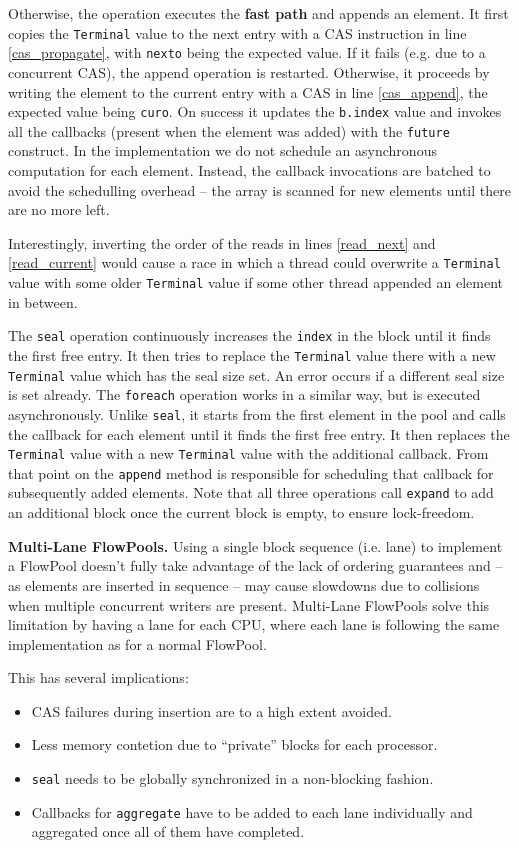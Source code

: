\documentclass[runningheads,a4paper]{llncs}
\begin{document}
Otherwise, the operation executes the \textbf{fast path} and appends
an element.
It first copies the \verb=Terminal= value to the next entry with a CAS
instruction in line \ref{cas_propagate}, with \verb=nexto= being the
expected value. If it fails (e.g. due to a concurrent CAS), the append
operation is restarted.
Otherwise, it proceeds by writing the element to the current entry with
a CAS in line \ref{cas_append}, the expected value being
\verb=curo=.
On success it updates the \verb=b.index= value and invokes all
the callbacks (present when the element was added) with
the \verb=future= construct.
In the implementation we do not schedule an asynchronous
computation for each element.
Instead, the callback invocations are batched to avoid the schedulling overhead
-- the array is scanned for new elements
until there are no more left.

Interestingly, inverting the order of the reads in lines
\ref{read_next} and \ref{read_current} would cause a race in which a
thread could overwrite a \verb=Terminal= value with some older
\verb=Terminal= value if some other thread appended an element in between.

The \verb=seal= operation continuously increases the \verb=index= in the block
until it finds the first free entry. It then tries to replace the \verb=Terminal=
value there with a new \verb=Terminal= value which has the seal size set.
An error occurs if a different seal size is set already. The \verb=foreach=
operation works in a similar way, but is executed asynchronously. Unlike
\verb=seal=, it starts from the first element in the pool and calls the
callback for each element until it finds the first free entry.
It then replaces the \verb=Terminal= value with a new \verb=Terminal=
value with the additional callback. From that point on the \verb=append=
method is responsible for scheduling that callback for subsequently added elements.
Note that all three operations call \verb=expand= to add an additional
block once the current block is empty, to ensure lock-freedom.

\textbf{Multi-Lane FlowPools.}
Using a single block sequence (i.e. lane) to implement a FlowPool
doesn't fully take advantage of the lack of ordering guarantees and --
as elements are inserted in sequence -- may cause slowdowns due to
collisions when multiple concurrent writers are present. Multi-Lane
FlowPools solve this limitation by having a lane for each CPU, where
each lane is following the same implementation as for a normal
FlowPool.

This has several implications:
\begin{itemize}
\item CAS failures during insertion are to a high extent avoided.
\item Less memory contetion due to ``private'' blocks for each
  processor.
\item \verb=seal= needs to be globally synchronized in a non-blocking
  fashion.
\item Callbacks for \verb=aggregate= have to be added to each lane
  individually and aggregated once all of them have completed.
\end{itemize}
\end{document}
